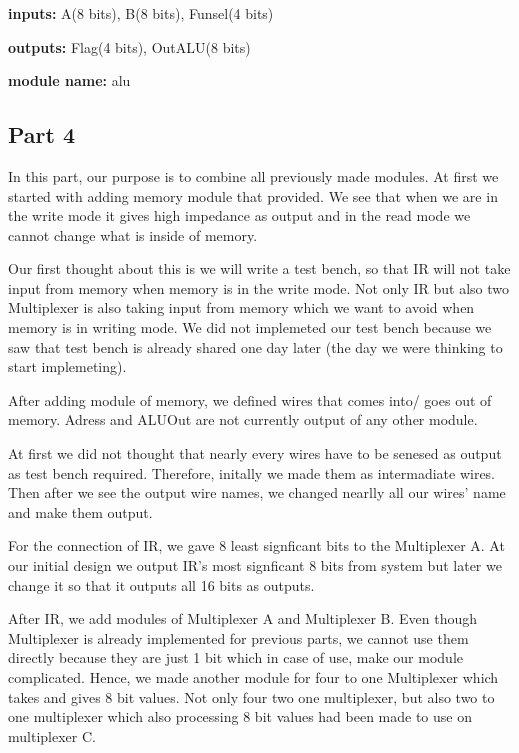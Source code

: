 \documentclass[pdftex,12pt,a4paper]{article}
\begin{document}
\subsubsection{}
\textbf{inputs:}  
A(8 bits),
B(8 bits),
Funsel(4 bits)

\textbf{outputs:}    
Flag(4 bits),
OutALU(8 bits)

\textbf{module name:} alu

\subsection{Part 4}
In this part, our purpose is to combine all previously made modules. 
At first we started with adding memory module that provided. We see that when 
we are in the write mode it gives high impedance as output and in the read mode
 we cannot change what is inside of memory.

 Our first thought about this is we will write a test bench, so that IR will not
  take input from memory when memory is in the write mode. Not only IR but also 
  two Multiplexer is also taking input from memory which we want to avoid when 
  memory is in writing mode. We did not implemeted our test bench because we saw
   that test bench is already shared one day later (the day we were thinking to 
   start implemeting).

   After adding module of memory, we defined wires that comes into/ goes out of 
   memory. Adress and ALUOut are not currently output of any other module. 

   At first we did not thought that nearly every wires have to be senesed as 
   output as test bench required. Therefore, initally we made them as intermadiate 
   wires. Then after we see the output wire names, we changed nearlly all our wires' 
   name and make them output.

	For the connection of IR, we gave 8 least signficant bits to the Multiplexer A.
	At our initial design we output IR's most signficant 8 bits from system but later we change
	 it so that it outputs all 16 bits as outputs.

	After IR, we add modules of Multiplexer A and Multiplexer B. Even though 
	Multiplexer is already implemented for previous parts, we cannot use them 
	directly because they are just 1 bit which in case of use, make our module
	complicated. Hence, we made another module for four to one Multiplexer which 
	takes and gives 8 bit values. Not only four two one multiplexer, but also two
	to one multiplexer which also processing 8 bit values had been made to use on 
	multiplexer C. 
\end{document}
